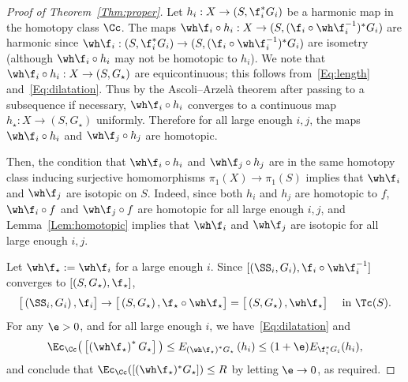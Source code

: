 \begin{proof}[{Proof of Theorem~\ref{Thm:proper}}]
Let $h_i:X \to (S, \f_i^\ast G_i)$ be a harmonic map in the homotopy class $\Cc$. The maps $\wh \f_i \circ h_i:X \to (S, (\f_i \circ \wh \f_i^{-1})^\ast G_i)$ are harmonic since $\wh \f_i: (S, \f_i^\ast G_i) \to (S, (\f_i \circ \wh \f_i^{-1})^\ast G_i)$ are isometry (although $\wh \f_i \circ h_i$ may not be homotopic to $h_i$). We note that $\wh \f_i \circ h_i: X \to (S, G_\star)$ are equicontinuous; this follows from~\eqref{Eq:length} and~\eqref{Eq:dilatation}. Thus by the Ascoli--Arzel\`a theorem after passing to a subsequence if necessary, $\wh \f_i \circ h_i$ converges to a continuous map $h_\star: X \to (S, G_\star)$ uniformly. Therefore for all large enough $i, j$, the maps $\wh \f_i \circ h_i$ and $\wh \f_j \circ h_j$ are homotopic.

Then, the condition that $\wh \f_i \circ h_i$ and $\wh \f_j \circ h_j$ are in the same homotopy class inducing surjective homomorphisms $\pi_1(X) \to \pi_1(S)$ implies that $\wh \f_i$ and $\wh \f_j$ are isotopic on $S$. Indeed, since both $h_i$ and $h_j$ are homotopic to $f$, $\wh \f_i \circ f$ and $\wh \f_j \circ f$ are homotopic for all large enough $i, j$, and Lemma~\ref{Lem:homotopic} implies that $\wh \f_i$ and $\wh \f_j$ are isotopic for all large enough $i, j$.

Let $\wh \f_\star:=\wh \f_i$ for a large enough $i$. Since $[(\SS_i, G_i), \f_i \circ \wh \f_i^{-1}]$ converges to $[(S, G_\star), \f_\star]$,
\[
\big[\left(\SS_i, G_i\right), \f_i\big] \to \big[\left(S, G_\star\right), \f_\star \circ \wh \f_\star\big]=\big[\left(S, G_\star\right), \wh \f_\star\big] \quad \text{ in }\Tc(S).
\]
For any $\e>0$, and for all large enough $i$, we have~\eqref{Eq:dilatation} and
\[
\Ec_\Cc\big(\left[\left(\wh \f_\star\right)^\ast G_\star\right]\big) \le E_{\left(\wh \f_\star\right)^\ast G_\star}\left(h_i\right) \le (1+\e)E_{\f_i^\ast G_i}(h_i),
\]
and conclude that $\Ec_\Cc([(\wh \f_\star)^\ast G_\star]) \le R$ by letting $\e \to 0$, as required.
\end{proof}

